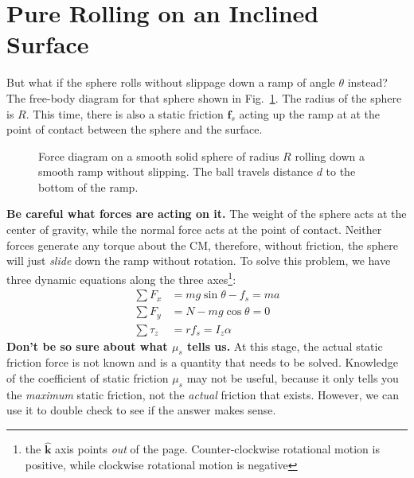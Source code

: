 \documentclass{../../../oss-handout}
\newcommand{\mb}[1]{\mathbf{#1}}
\newcommand{\kkk}{\bm{\hat{k}}}
\begin{document}
\section{Pure Rolling on an Inclined Surface}
But what if the sphere rolls without slippage down a ramp of angle $\theta$
instead? The free-body diagram for that sphere shown in Fig.~\ref{roll-ramp}.
The radius of the sphere is $R$. This time, there is also a static friction
$\mb{f}_s$ acting up the ramp at at the point of contact between the sphere and
the surface.
\begin{figure}[!ht]
  \centering
  \caption{Force diagram on a smooth solid sphere of radius $R$ rolling down a
    smooth ramp without slipping. The ball travels distance $d$ to the bottom
    of the ramp.}
  \label{roll-ramp}
\end{figure}

\textbf{Be careful what forces are acting on it.} The weight of the sphere acts
at the center of gravity, while the normal force acts at the point of contact.
Neither forces generate any torque about the CM, therefore, without friction,
the sphere will just \emph{slide} down the ramp without rotation. To solve this
problem, we have three dynamic equations along the three
axes\footnote{the $\kkk$ axis points \emph{out} of the page. Counter-clockwise
  rotational motion is positive, while clockwise rotational motion is negative}:
\begin{align}
  \sum F_x&=mg\sin\theta-f_s=ma\\ \label{f_x}
  \sum F_y&=N-mg\cos\theta=0\\
  \sum\tau_z&=rf_s=I_z\alpha \label{tau}
\end{align}
\textbf{Don't be so sure about what $\mu_s$ tells us.} At this stage, the
actual static friction force is not known and is a quantity that needs to be
solved. Knowledge of the coefficient of static friction $\mu_s$ may not be
useful, because it only tells you the \emph{maximum} static friction, not the
\emph{actual} friction that exists. However, we can use it to double check to
see if the answer makes sense.
\end{document}
